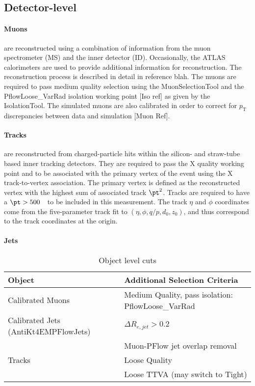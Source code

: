 \subsection{Detector-level}

\paragraph{Muons} are reconstructed using a combination of information from the muon spectrometer (MS) and the inner detector (ID). Occasionally, the ATLAS calorimeters are used to provide additional information for reconstruction. The reconstruction process is described in detail in reference blah.
The muons are required to pass medium quality selection using the MuonSelectionTool and the PflowLoose\_VarRad isolation working point [Iso ref] as given by the IsolationTool. The simulated muons are also calibrated in order to correct for $p_\text{T}$ discrepancies between data and simulation [Muon Ref].

\paragraph{Tracks} are reconstructed from charged-particle hits within the silicon- and straw-tube based inner tracking detectors. They are required to pass the X quality working point and to be associated with the primary vertex of the event using the X track-to-vertex association.  The primary vertex is defined  as the reconstructed vertex with the highest sum of associated track $\pt^2$.  Tracks are required to have a $\pt>500$~\MeV~to be included in this measurement.  The track $\eta$ and $\phi$ coordinates come from the five-parameter track fit to $(\eta,\phi,q/p,d_0,z_0)$, and thus correspond to the track coordinates at the origin.

\paragraph{Jets}

\begin{table}[h!]
    \centering
    \begin{tabular}{l|l}
    \hline
     \textbf{Object} & \textbf{Additional Selection Criteria} \\ \hline
     Calibrated Muons & Medium Quality, pass isolation: PflowLoose\_VarRad \\ \hline
     Calibrated Jets (AntiKt4EMPFlowJets) & $\Delta R_{e,jet} > 0.2$ \\
      & Muon-PFlow jet overlap removal \\ \hline
     Tracks & Loose Quality \\
      & Loose TTVA (may switch to Tight) \\ \hline
    \end{tabular}
    \caption{Object level cuts}
    \label{tab:ObjCuts}
\end{table}

